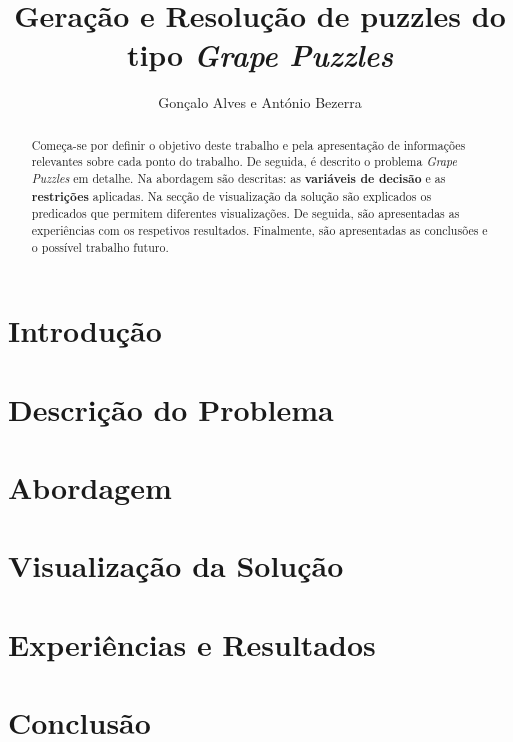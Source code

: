 \documentclass[runningheads]{llncs}
\begin{document}
%
\title{Geração e Resolução de puzzles do tipo \textit{Grape Puzzles}}
%
%
\author{Gonçalo Alves e
António Bezerra}
%
%
%
\maketitle              %
%
\begin{abstract}
Começa-se por definir o objetivo deste trabalho e pela apresentação de informações relevantes sobre cada ponto do trabalho.
De seguida, é descrito o problema \textit{Grape Puzzles} em detalhe.
Na abordagem são descritas: as \textbf{variáveis de decisão} e as \textbf{restrições} aplicadas.
Na secção de visualização da solução são explicados os predicados que permitem diferentes visualizações.
De seguida, são apresentadas as experiências com os respetivos resultados.
Finalmente, são apresentadas as conclusões e o possível trabalho futuro.


\end{abstract}
%
%
%
\section{Introdução}


\section{Descrição do Problema}


\section{Abordagem}


\section{Visualização da Solução}


\section{Experiências e Resultados}


\section{Conclusão}

\end{document}

